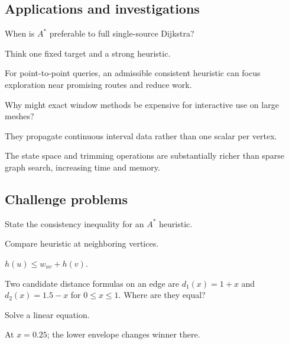 \subsection*{Applications and investigations}

\begin{exercise}\label{exr:vii39-ped-13}
When is \(A^*\) preferable to full single-source Dijkstra?
\end{exercise}

\begin{hint}
Think one fixed target and a strong heuristic.
\end{hint}

\begin{solution}
For point-to-point queries, an admissible consistent heuristic can focus exploration near promising routes and reduce work.
\end{solution}

\begin{exercise}[Preprocessing]\label{exr:vii39-ped-14}
Why might exact window methods be expensive for interactive use on large meshes?
\end{exercise}

\begin{hint}
They propagate continuous interval data rather than one scalar per vertex.
\end{hint}

\begin{solution}
The state space and trimming operations are substantially richer than sparse graph search, increasing time and memory.
\end{solution}

\subsection*{Challenge problems}

\begin{exercise}[Consistency]\label{exr:vii39-ped-15}
State the consistency inequality for an \(A^*\) heuristic.
\end{exercise}

\begin{hint}
Compare heuristic at neighboring vertices.
\end{hint}

\begin{solution}
\(h(u)\le w_{uv}+h(v)\).
\end{solution}

\begin{exercise}\label{exr:vii39-ped-16}
Two candidate distance formulas on an edge are \(d_1(x)=1+x\) and \(d_2(x)=1.5-x\) for \(0\le x\le1\).  Where are they equal?
\end{exercise}

\begin{hint}
Solve a linear equation.
\end{hint}

\begin{solution}
At \(x=0.25\); the lower envelope changes winner there.
\end{solution}

